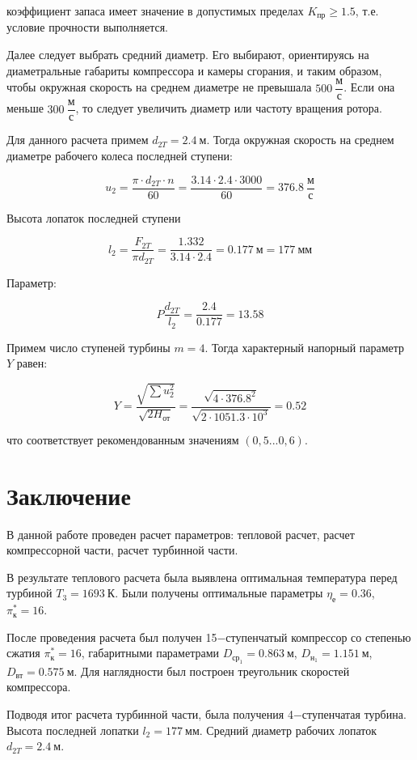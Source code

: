 коэффициент запаса имеет значение в допустимых пределах $K_{\text{пр}}\geq 1.5$, т.е. условие прочности выполняется.

Далее следует выбрать средний диаметр. Его выбирают, ориентируясь на диаметральные габариты компрессора и камеры сгорания, и таким образом, чтобы окружная скорость на среднем диаметре не превышала $500 \ \dfrac{\text{м}}{\text{с}}$. Если она меньше $300 \ \dfrac{\text{м}}{\text{с}}$, то следует увеличить диаметр или частоту вращения ротора.

Для данного расчета примем $d_{2T}=2.4 \ \text{м}$. Тогда окружная скорость на среднем диаметре рабочего колеса последней ступени:

\begin{equation} \label{eu_eqn}
		u_{2} =\dfrac{\pi \cdot d_{2T} \cdot n}{60}= \dfrac{3.14\cdot 2.4\cdot 3000}{60}= 376.8 \ \dfrac{\text{м}}{\text{с}}
\end{equation}

Высота лопаток последней ступени

\begin{equation} \label{eu_eqn}
		l_{2}=\dfrac{F_{2T}}{\pi d_{2T}}= \dfrac{1.332}{3.14\cdot 2.4 }=0.177 \ \text{м}=177 \ \text{мм}
	\end{equation}

Параметр:

\begin{equation} \label{eu_eqn}
		P\dfrac{d_{2T}}{l_{2}}=\dfrac{2.4}{0.177}=13.58
	\end{equation}

Примем число ступеней турбины $m=4$. Тогда характерный напорный параметр $Y$ равен:

\begin{equation} \label{eu_eqn}
		Y=\dfrac{\sqrt{ \sum u_{2}^2 }}{\sqrt{ 2H_{\text{от}} }}=\dfrac{\sqrt{ 4\cdot 376.8^2}}{\sqrt{ 2\cdot 1051.3\cdot 10^3}}=0.52
	\end{equation}

что соответствует рекомендованным значениям $(0,5...0,6)$.

\newpage
\section{Заключение}

В данной работе проведен расчет параметров: тепловой расчет, расчет компрессорной части, расчет турбинной части.

В результате теплового расчета была выявлена оптимальная температура перед турбиной $T_3=1693 \ \text{К}$. Были получены оптимальные параметры $\eta_{\text{е}}=0.36$, $\pi_{\text{к}}^*=16$.

После проведения расчета был получен 15−ступенчатый компрессор со степенью сжатия $\pi_{\text{к}}^*=16$, габаритными параметрами $D_{\text{ср}_{1}}=0.863 \ \text{м}$, $D_{\text{н}_{1}}=1.151 \ \text{м}$, $D_{\text{вт}}=0.575 \ \text{м}$. Для наглядности был построен треугольник скоростей
компрессора.

Подводя итог расчета турбинной части, была получения 4−ступенчатая турбина. Высота последней лопатки $l_{2}=177 \ \text{мм}$. Средний диаметр рабочих лопаток $d_{2T}=2.4 \ \text{м}$.